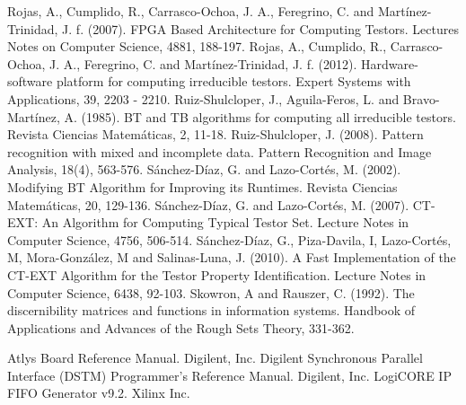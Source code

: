 \documentclass[authoryear,preprint,review,12pt]{elsarticle}
\begin{document}
\begin{thebibliography}{00}
Rojas, A., Cumplido, R., Carrasco-Ochoa, J. A., Feregrino, C. and Mart\'inez-Trinidad, J. f. (2007). FPGA Based Architecture for Computing Testors. Lectures Notes on Computer Science, 4881, 188-197.
Rojas, A., Cumplido, R., Carrasco-Ochoa, J. A., Feregrino, C. and Mart\'inez-Trinidad, J. f. (2012). Hardware-software platform for computing irreducible testors. Expert Systems with Applications, 39, 2203 - 2210.
Ruiz-Shulcloper, J., Aguila-Feros, L. and Bravo-Mart\'inez, A. (1985). BT and TB algorithms for computing all irreducible testors. Revista Ciencias Matem\'aticas, 2, 11-18.
Ruiz-Shulcloper, J. (2008). Pattern recognition with mixed and incomplete data. Pattern Recognition and Image Analysis, 18(4), 563-576.
S\'anchez-D\'iaz, G. and Lazo-Cort\'es, M. (2002). Modifying BT Algorithm for Improving its Runtimes. Revista Ciencias Matem\'aticas, 20, 129-136.
S\'anchez-D\'iaz, G. and Lazo-Cort\'es, M. (2007). CT-EXT: An Algorithm for Computing Typical Testor Set. Lecture Notes in Computer Science, 4756, 506-514.
S\'anchez-D\'iaz, G., Piza-Davila, I, Lazo-Cort\'es, M, 
Mora-Gonz\'alez, M and Salinas-Luna, J. (2010). A Fast Implementation of the CT-EXT Algorithm for the Testor Property Identification. Lecture Notes in Computer Science, 6438, 92-103.
Skowron, A and Rauszer, C. (1992). The discernibility matrices and functions in information systems. Handbook of Applications and Advances of the Rough Sets Theory, 331-362.

Atlys Board Reference Manual. Digilent, Inc.
Digilent Synchronous Parallel Interface (DSTM) Programmer's Reference Manual. Digilent, Inc.
LogiCORE IP FIFO Generator v9.2. Xilinx Inc.


\end{thebibliography}
\end{document}
